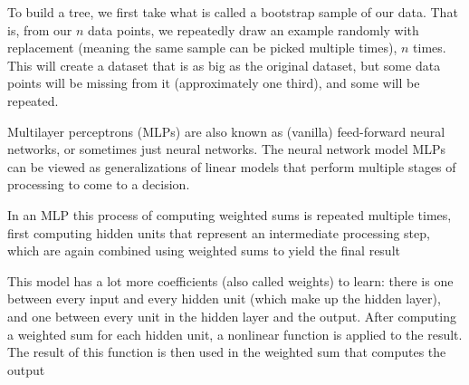\documentclass[12pt]{amsart}
\begin{document}
To build a tree, we first take what is called a bootstrap sample of our data. That is, from our $n$ data points, we repeatedly draw an example randomly with replacement (meaning the same sample can be picked multiple times), $n$ times. This will create a dataset that is as big as the original dataset, but some data points will be missing from it (approximately one third), and some will be repeated.




Multilayer perceptrons (MLPs) are also known as (vanilla) feed-forward neural networks, or sometimes just neural networks.
The neural network model
MLPs can be viewed as generalizations of linear models that perform multiple stages of processing to come to a decision.

In an MLP this process of computing weighted sums is repeated multiple times, first computing hidden units that represent an intermediate processing step, which are again combined using weighted sums to yield the final result

This model has a lot more coefficients (also called weights) to learn: there is one between every input and every hidden unit (which make up the hidden layer), and one between every unit in the hidden layer and the output. After computing a weighted sum for each hidden unit, a nonlinear function is applied to the result. The result of this function is then used in the weighted sum that computes the output
\end{document}

